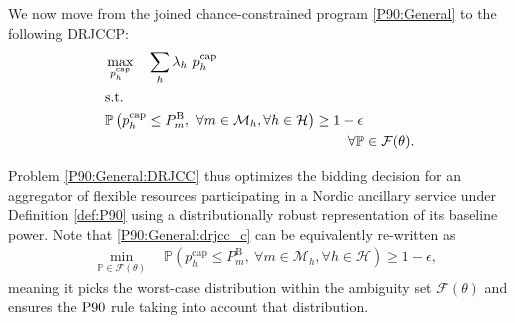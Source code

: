 \documentclass[conference]{IEEEtran}
\begin{document}
We now move from the joined chance-constrained program \eqref{P90:General} to the following \ac{DRJCCP}: 
%
\begin{subequations}\label{P90:General:DRJCC}
    \begin{align}
       & \max_{p_{h}^{\text{cap}}} \quad  \sum_h \lambda_h \ p_{h}^{\text{cap}}                                                                                                                                                                                                     \\
            &\text{s.t.} \nonumber  \\
    &           \mathbb{P}  \left( p_{h}^{\text{cap}} \leq P_{m}^{\text{B}}, \ \forall{m} \in \mathcal{M}_{h},  \forall{h} \in \mathcal{H}  \right) 
         \geq 1 - \epsilon \notag\\
        & \hspace{6.1cm} \forall{\mathbb{P}} \in \mathcal{F}(\theta). \label{P90:General:drjcc_c}
    \end{align}
\end{subequations}

Problem \eqref{P90:General:DRJCC} thus optimizes the bidding decision for an aggregator of flexible resources participating in a Nordic ancillary service under Definition \ref{def:P90} using a distributionally robust representation of its baseline power. Note that \eqref{P90:General:drjcc_c} can be equivalently re-written as 
    \begin{align}
    &     \min_{\mathbb{P} \in \mathcal{F}(\theta)} \quad       \mathbb{P}  \left( p_{h}^{\text{cap}} \leq P_{m}^{\text{B}}, \ \forall{m} \in \mathcal{M}_{h},  \forall{h} \in \mathcal{H}  \right) 
         \geq 1 - \epsilon, \label{P90:General:drjcc_c2}
    \end{align}
meaning it picks the worst-case distribution within the ambiguity set $\mathcal{F}(\theta)$ and ensures the $\rm{P90}$ rule taking into account that distribution. 


\vspace{2mm}
\end{document}
